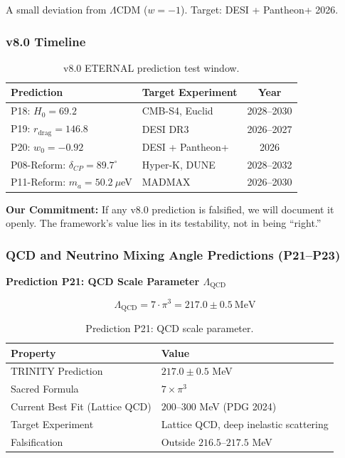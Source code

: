 \documentclass[aps,prd,preprint,superscriptaddress,showpacs,nofootinbib,longbibliography]{revtex4-2}
\begin{document}
A small deviation from $\Lambda$CDM ($w = -1$). Target: DESI + Pantheon+ 2026.

\subsubsection{v8.0 Timeline}

\begin{table}[h]
\centering
\small
\begin{tabular}{llc}
\toprule
Prediction & Target Experiment & Year \\
\midrule
P18: $H_0 = 69.2$ & CMB-S4, Euclid & 2028--2030 \\
P19: $r_{\text{drag}} = 146.8$ & DESI DR3 & 2026--2027 \\
P20: $w_0 = -0.92$ & DESI + Pantheon+ & 2026 \\
P08-Reform: $\delta_{CP} = 89.7^\circ$ & Hyper-K, DUNE & 2028--2032 \\
P11-Reform: $m_a = 50.2~\mu$eV & MADMAX & 2026--2030 \\
\bottomrule
\end{tabular}
\caption{v8.0 ETERNAL prediction test window.}
\end{table}

\textbf{Our Commitment:} If any v8.0 prediction is falsified, we will document it openly. The framework's value lies in its testability, not in being ``right.''

\subsubsection{QCD and Neutrino Mixing Angle Predictions (P21--P23)}

\textbf{Prediction P21: QCD Scale Parameter $\Lambda_{\text{QCD}}$}

\begin{equation}
\Lambda_{\text{QCD}} = 7 \cdot \pi^3 = 217.0 \pm 0.5~\text{MeV}
\end{equation}

\begin{table}[h]
\centering
\begin{tabular}{ll}
\toprule
Property & Value \\
\midrule
TRINITY Prediction & $217.0 \pm 0.5$ MeV \\
Sacred Formula & $7 \times \pi^3$ \\
Current Best Fit (Lattice QCD) & $200$--$300$ MeV (PDG 2024) \\
Target Experiment & Lattice QCD, deep inelastic scattering \\
Falsification & Outside $216.5$--$217.5$ MeV \\
\bottomrule
\end{tabular}
\caption{Prediction P21: QCD scale parameter.}
\end{table}
\end{document}
